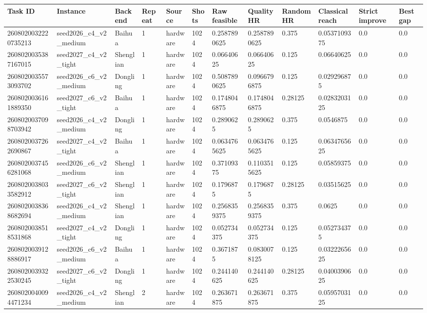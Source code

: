 \begin{tabular}{llllllllllll}
\toprule
Task ID & Instance & Backend & Repeat & Source & Shots & Raw feasible & Quality HR & Random HR & Classical reach & Strict improve & Best gap \\
\midrule
2608020032220735213 & seed2026\_c4\_v2\_medium & Baihua & 1 & hardware & 1024 & 0.2587890625 & 0.2587890625 & 0.375 & 0.0537109375 & 0.0 & 0.0 \\
2608020035387167015 & seed2027\_c4\_v2\_tight & Shenglian & 1 & hardware & 1024 & 0.06640625 & 0.06640625 & 0.125 & 0.06640625 & 0.0 & 0.0 \\
2608020035573093702 & seed2026\_c6\_v2\_medium & Dongling & 1 & hardware & 1024 & 0.5087890625 & 0.0966796875 & 0.125 & 0.029296875 & 0.0 & 0.0 \\
2608020036161889350 & seed2027\_c6\_v2\_tight & Baihua & 1 & hardware & 1024 & 0.1748046875 & 0.1748046875 & 0.28125 & 0.0283203125 & 0.0 & 0.0 \\
2608020037098703942 & seed2026\_c4\_v2\_medium & Dongling & 1 & hardware & 1024 & 0.2890625 & 0.2890625 & 0.375 & 0.0546875 & 0.0 & 0.0 \\
2608020037262690867 & seed2027\_c4\_v2\_tight & Baihua & 1 & hardware & 1024 & 0.0634765625 & 0.0634765625 & 0.125 & 0.0634765625 & 0.0 & 0.0 \\
2608020037456281068 & seed2026\_c6\_v2\_medium & Shenglian & 1 & hardware & 1024 & 0.37109375 & 0.1103515625 & 0.125 & 0.05859375 & 0.0 & 0.0 \\
2608020038033582912 & seed2027\_c6\_v2\_tight & Shenglian & 1 & hardware & 1024 & 0.1796875 & 0.1796875 & 0.28125 & 0.03515625 & 0.0 & 0.0 \\
2608020038368682694 & seed2026\_c4\_v2\_medium & Shenglian & 1 & hardware & 1024 & 0.2568359375 & 0.2568359375 & 0.375 & 0.0625 & 0.0 & 0.0 \\
2608020038518531868 & seed2027\_c4\_v2\_tight & Dongling & 1 & hardware & 1024 & 0.052734375 & 0.052734375 & 0.125 & 0.052734375 & 0.0 & 0.0 \\
2608020039128886917 & seed2026\_c6\_v2\_medium & Baihua & 1 & hardware & 1024 & 0.3671875 & 0.0830078125 & 0.125 & 0.0322265625 & 0.0 & 0.0 \\
2608020039322530245 & seed2027\_c6\_v2\_tight & Dongling & 1 & hardware & 1024 & 0.244140625 & 0.244140625 & 0.28125 & 0.0400390625 & 0.0 & 0.0 \\
2608020040094471234 & seed2026\_c4\_v2\_medium & Shenglian & 2 & hardware & 1024 & 0.263671875 & 0.263671875 & 0.375 & 0.0595703125 & 0.0 & 0.0 \\

\end{tabular}

